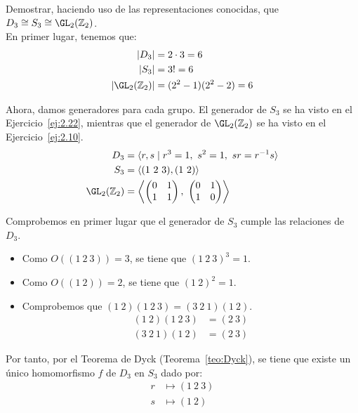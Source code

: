 \begin{ejercicio}\label{ej:2.28}
    Demostrar, haciendo uso de las representaciones conocidas, que $D_3 \cong S_3 \cong \GL_2(\mathbb{Z}_2)$.\\

    En primer lugar, tenemos que:
    \begin{align*}
        |D_3|&=2\cdot 3=6\\
        |S_3|&=3!=6\\
        |\GL_2(\mathbb{Z}_2)|&=(2^2-1)(2^2-2)=6
    \end{align*}

    Ahora, damos generadores para cada grupo. El generador de $S_3$ se ha visto en el Ejercicio~\ref{ej:2.22}, mientras que el generador de $\GL_2(\mathbb{Z}_2)$ se ha visto en el Ejercicio~\ref{ej:2.10}.
    \begin{align*}
        D_3 &= \langle r, s \mid r^3=1,\ s^2=1,\ sr=r^{-1}s \rangle\\
        S_3 &= \langle (1\ 2\ 3), (1\ 2) \rangle\\
        \GL_2(\mathbb{Z}_2) &= \left\langle\begin{pmatrix}0&1\\1&1\end{pmatrix},\ \begin{pmatrix}0&1\\1&0\end{pmatrix}\right\rangle
    \end{align*}

    Comprobemos en primer lugar que el generador de $S_3$ cumple las relaciones de $D_3$.
    \begin{itemize}
        \item Como $O((1\ 2\ 3))=3$, se tiene que $(1\ 2\ 3)^3=1$.
        \item Como $O((1\ 2))=2$, se tiene que $(1\ 2)^2=1$.
        \item Comprobemos que $(1\ 2)(1\ 2\ 3)=(3\ 2\ 1)(1\ 2)$.
        \begin{align*}
            (1\ 2)(1\ 2\ 3) &= (2\ 3)\\
            (3\ 2\ 1)(1\ 2) &= (2\ 3)
        \end{align*}
    \end{itemize}

    Por tanto, por el Teorema de Dyck (Teorema~\ref{teo:Dyck}), se tiene que existe un único homomorfismo $f$ de $D_3$ en $S_3$ dado por:
    \begin{align*}
        r &\mapsto (1\ 2\ 3)\\
        s &\mapsto (1\ 2)
    \end{align*}


\end{ejercicio}
